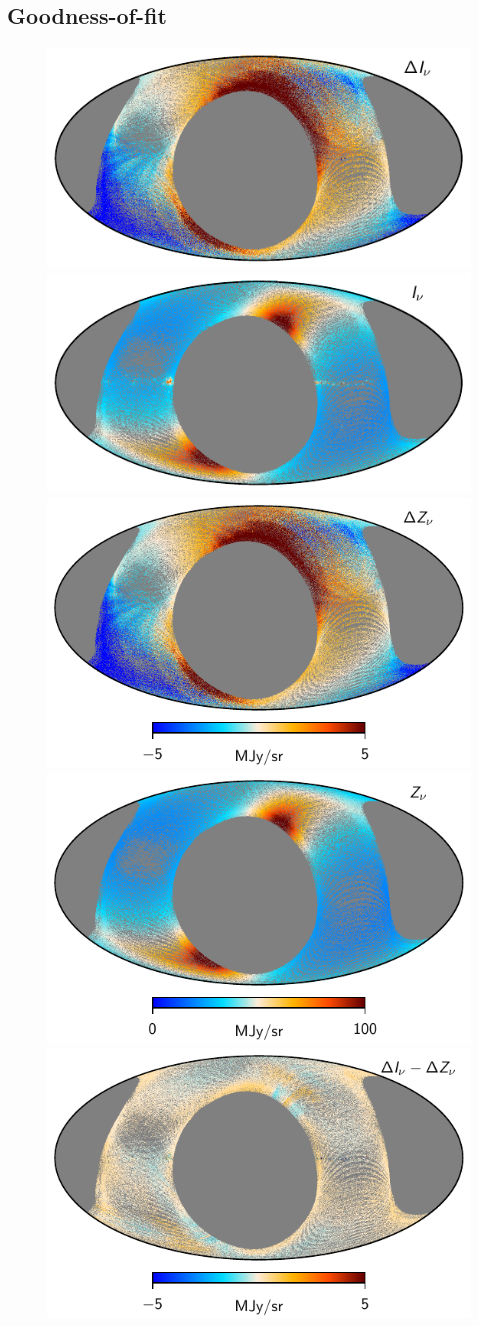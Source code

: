 \documentclass{aa}
\begin{document}
\subsection{Goodness-of-fit}
\begin{figure}
    \centering
    \includegraphics[width=0.49\linewidth]{figs/maptot_06a_week_minus_full.pdf}
    \includegraphics[width=0.49\linewidth]{figs/maptot_06a_week.pdf}\\
    \includegraphics[width=0.49\linewidth]{figs/mapzodi_06a_week_minus_full.pdf}
    \includegraphics[width=0.49\linewidth]{figs/mapzodi_06a_week.pdf}
    \includegraphics[width=0.49\linewidth]{figs/map_06a_week_minus_full.pdf}

\end{figure}
\end{document}
